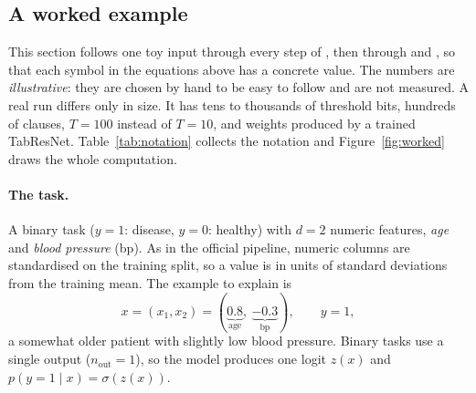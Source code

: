\subsection{A worked example}\label{sec:example}
This section follows one toy input through every step of , then through \imn{} and
, so that each symbol in the equations above has a concrete value. The numbers are
\emph{illustrative}: they are chosen by hand to be easy to follow and are not measured. A real run
differs only in size. It has tens to thousands of threshold bits, hundreds of clauses, $T=100$
instead of $T=10$, and weights produced by a trained TabResNet. Table~\ref{tab:notation} collects
the notation and Figure~\ref{fig:worked} draws the whole computation.

\paragraph{The task.} A binary task ($y=1$: disease, $y=0$: healthy) with $d=2$ numeric features, \emph{age} and
\emph{blood pressure} (bp). As in the official \imn{} pipeline, numeric columns are standardised on the
training split, so a value is in units of standard deviations from the training mean. The example to
explain is
\[
  x=(x_1,x_2)=(\underbrace{0.8}_{\text{age}},\ \underbrace{-0.3}_{\text{bp}}),\qquad y=1 ,
\]
a somewhat older patient with slightly low blood pressure. Binary tasks use a single output
($n_\text{out}=1$), so the model produces one logit $z(x)$ and $p(y{=}1\mid x)=\sigma(z(x))$.

